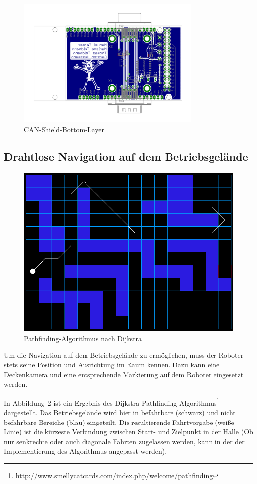 \begin{figure}[H]
\centering
 \includegraphics[width=0.8\textwidth]{Abbildungen/CAN-Shield-Layout-Bottom}
\caption[CAN-Shield-Bottom-Layer]{CAN-Shield-Bottom-Layer}
\label{fig:CAN-Shield-Layout-Bottom}
\end{figure}

\subsection{Drahtlose Navigation auf dem Betriebsgelände}
\label{sec:Navigation}
\begin{figure}
\centering
    \includegraphics[width=.8\textwidth]{Abbildungen/Dijkstra}
    \caption[Dijkstra]{Pathfinding-Algorithmus nach Dijkstra}
    \label{fig:Dijkstra}
\end{figure}
Um die Navigation auf dem Betriebsgelände zu ermöglichen, muss der Roboter stets seine Position und Ausrichtung im Raum kennen. Dazu kann eine Deckenkamera und eine entsprechende Markierung auf dem Roboter eingesetzt werden.

In Abbildung~\ref{fig:Dijkstra} ist ein Ergebnis des Dijkstra Pathfinding Algorithmus\footnote{http://www.smellycatcards.com/index.php/welcome/pathfinding} dargestellt.
Das Betriebsgelände wird hier in befahrbare (schwarz) und nicht befahrbare Bereiche (blau) eingeteilt. Die resultierende Fahrtvorgabe (weiße Linie) ist die kürzeste Verbindung zwischen Start- und Zielpunkt in der Halle (Ob nur senkrechte oder auch diagonale Fahrten zugelassen werden, kann in der der Implementierung des Algorithmus angepasst werden).

